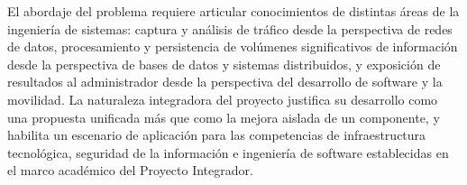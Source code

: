 El abordaje del problema requiere articular conocimientos de 
distintas áreas de la ingeniería de sistemas: captura y análisis de 
tráfico desde la perspectiva de redes de datos, procesamiento y 
persistencia de volúmenes significativos de información desde la 
perspectiva de bases de datos y sistemas distribuidos, y exposición 
de resultados al administrador desde la perspectiva del desarrollo 
de software y la movilidad. La naturaleza integradora del proyecto 
justifica su desarrollo como una propuesta unificada más que como 
la mejora aislada de un componente, y habilita un escenario de 
aplicación para las competencias de infraestructura tecnológica, 
seguridad de la información e ingeniería de software establecidas 
en el marco académico del Proyecto Integrador.